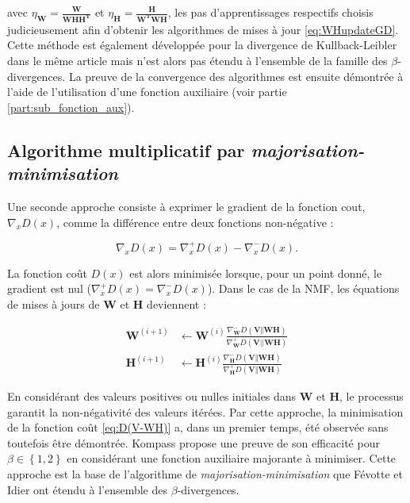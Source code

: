 avec $\eta_{\mathbf{W}} = \frac{\mathbf{W}}{\mathbf{WHH^T}}$ et $\eta_{\mathbf{H}} = \frac{\mathbf{H}}{\mathbf{W^TWH}}$, les pas d'apprentissages respectifs choisis judicieusement afin d'obtenir les algorithmes de mises à jour \ref{eq:WHupdateGD}. Cette méthode est également développée pour la divergence de Kullback-Leibler dans le même article mais n'est alors pas étendu à l'ensemble de la famille des $\beta$-divergences. La preuve de la convergence des algorithmes est ensuite démontrée à l'aide de l'utilisation d'une fonction auxiliaire (voir partie \ref{part:sub_fonction_aux}).


\subsection{Algorithme multiplicatif par \textit{majorisation-minimisation}}\label{part:majorisation-minimisation}
Une seconde approche \cite{cichocki2006csiszar} consiste à exprimer le gradient de la fonction cout, $\nabla_x D(x)$, comme la différence entre deux fonctions non-négative : 

\begin{equation}
\nabla_x D(x) = \nabla_x^+ D(x) - \nabla_x^- D(x).
\end{equation}

La fonction coût $D(x)$ est alors minimisée lorsque, pour un point donné, le gradient est nul ($\nabla_x^+ D(x) = \nabla_x^- D(x)$). Dans le cas de la NMF, les équations de mises à jours de $\mathbf{W}$ et $\mathbf{H}$ deviennent : 

\begin{subequations}
    \begin{align}
     \mathbf{W}^{(i+1)} & \leftarrow \mathbf{W}^{(i)}\frac{\nabla_\mathbf{W}^-D(\mathbf{V}\Vert\mathbf{WH})}{\nabla_\mathbf{W}^+D(\mathbf{V}\vert \vert \mathbf{WH})}\\
     \mathbf{H}^{(i+1)} & \leftarrow \mathbf{H}^{(i)}\frac{\nabla_\mathbf{H}^-D(\mathbf{V}\Vert\mathbf{WH})}{\nabla_\mathbf{H}^+D(\mathbf{V}\Vert\mathbf{WH})}    
    \end{align}
\end{subequations}

En considérant des valeurs positives ou nulles initiales dans $\mathbf{W}$ et $\mathbf{H}$, le processus garantit la non-négativité des valeurs itérées. Par cette approche, la minimisation de la fonction coût \ref{eq:D(V-WH)} a, dans un premier temps, été observée sans toutefois être démontrée. Kompass \cite{kompass_generalized_2007} propose une preuve de son efficacité pour $\beta \in \left\lbrace1,2 \right\rbrace$ en considérant une fonction auxiliaire majorante à minimiser. Cette approche est la base de l'algorithme de \textit{majorisation-minimisation} que Févotte et Idier \cite{fevotte_algorithms_2011} ont étendu à l'ensemble des $\beta$-divergences. 

